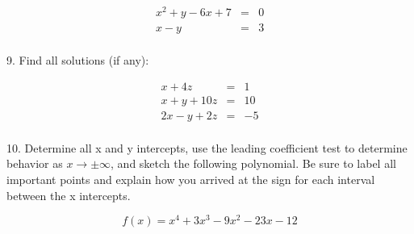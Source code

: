 \documentclass[letterpaper, 12pt]{article}
\begin{document}
\begin{eqnarray*}
x^2+y-6x+7 &=& 0 \\
x-y &=& 3 \\
\end{eqnarray*}

\newpage

9. Find all solutions (if any):

\begin{eqnarray*}
x+4z &=& 1 \\
x+y+10z &=& 10 \\
2x-y+2z &=& -5 \\
\end{eqnarray*}

\newpage

10. Determine all x and y intercepts, use the leading coefficient test to
determine behavior as $x\to\pm\infty$, and sketch the following polynomial.
Be sure to label all important points and explain how you arrived at the
sign for each interval between the x intercepts.

\[f(x)=x^4+3x^3-9x^2-23x-12\]
\end{document}
